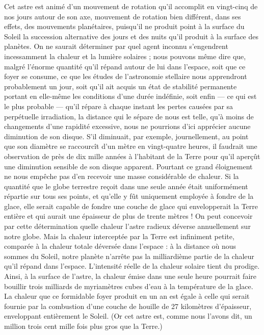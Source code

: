 \documentclass[a4paper, 11pt, oneside]{article}
\begin{document}
Cet astre est animé d'un mouvement de rotation qu'il accomplit en vingt-cinq de nos jours autour de son axe, mouvement de rotation bien différent, dans ses effets, des mouvements planétaires, puisqu'il ne produit point à la surface du Soleil la succession alternative des jours et des nuits qu'il produit à la surface des planètes. On ne saurait déterminer par quel agent inconnu s'engendrent incessamment la chaleur et la lumière solaires ; nous pouvons même dire que, malgré l'énorme quantité qu'il répand autour de lui dans l'espace, soit que ce foyer se consume, ce que les études de l'astronomie stellaire nous apprendront probablement un jour, soit qu'il ait acquis un état de stabilité permanente portant en elle-même les conditions d'une durée indéfinie, soit enfin --- ce qui est le plus probable --- qu'il répare à chaque instant les pertes causées par sa perpétuelle irradiation, la distance qui le sépare de nous est telle, qu'à moins de changements d'une rapidité excessive, nous ne pourrions d'ici apprécier aucune diminution de son disque. S'il diminuait, par exemple, journellement, au point que son diamètre se raccourcît d'un mètre en vingt-quatre heures, il faudrait une observation de près de dix mille années à l'habitant de la Terre pour qu'il aperçût une diminution sensible de son disque apparent. Pourtant ce grand éloignement ne nous empêche pas d'en recevoir une masse considérable de chaleur. Si la quantité que le globe terrestre reçoit dans une seule année était uniformément répartie sur tous ses points, et qu'elle y fût uniquement employée à fondre de la glace, elle serait capable de fondre une couche de glace qui envelopperait la Terre entière et qui aurait une épaisseur de plus de trente mètres ! On peut concevoir par cette détermination quelle chaleur l'astre radieux déverse annuellement sur notre globe. Mais la chaleur interceptée par la Terre est infiniment petite, comparée à la chaleur totale déversée dans l'espace : à la distance où nous sommes du Soleil, notre planète n'arrête pas la milliardième partie de la chaleur qu'il répand dans l'espace. L'intensité réelle de la chaleur solaire tient du prodige. Ainsi, à la surface de l'astre, la chaleur émise dans une seule heure pourrait faire bouillir trois milliards de myriamètres cubes d'eau à la température de la glace. La chaleur que ce formidable foyer produit en un an est égale à celle qui serait fournie par la combustion d'une couche de houille de 27 kilomètres d'épaisseur, enveloppant entièrement le Soleil. (Or cet astre est, comme nous l'avons dit, un million trois cent mille fois plus gros que la Terre.)
\end{document}
